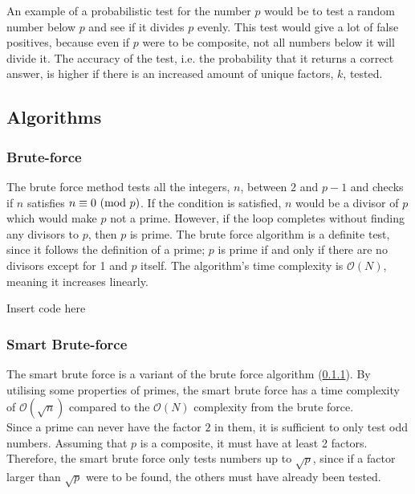 \documentclass[main.tex]{subfiles}
\begin{document}
An example of a probabilistic test for the number $p$ would be to test a random
number below $p$ and see if it divides $p$ evenly. This test would give a lot of
false positives, because even if $p$ were to be composite, not all numbers below it will
divide it. The accuracy of the test, i.e. the probability that it returns a
correct answer, is higher if there is an increased amount of unique factors,
$k$, tested.

\subsection{Algorithms}

\subsubsection{Brute-force} \label{brute} The brute force method tests all the
integers, $n$, between $2$ and $p-1$ and checks if $n$ satisfies $n \equiv 0
\ (\mathrm{mod}\ p)$. If the condition is satisfied, $n$ would be a divisor of $p$ which
would make $p$ not a prime. However, if the loop completes without finding any
divisors to $p$, then $p$ is prime. The brute force algorithm is a definite
test, since it follows the definition of a prime; $p$ is prime if and only if
there are no divisors except for 1 and $p$ itself. The algorithm's time
complexity is $\mathcal{O}(N)$, meaning it increases linearly. \newline

\begin{python}
  Insert code here
\end{python}

\subsubsection{Smart Brute-force}
The smart brute force is a variant of the brute force algorithm (\ref{brute}).
By utilising some properties of primes, the smart brute force has a time
complexity of $\mathcal{O}(\sqrt{n})$ compared to the $\mathcal{O}(N)$
complexity from the brute force. \\

Since a prime can never have the factor $2$ in them, it is sufficient to only
test odd numbers. Assuming that $p$ is a composite, it must have at least 2
factors. Therefore, the smart brute force only tests numbers up to $\sqrt{p}$,
since if a factor larger than $\sqrt{p}$ were to be found, the others must have
already been tested. \newline
\end{document}
